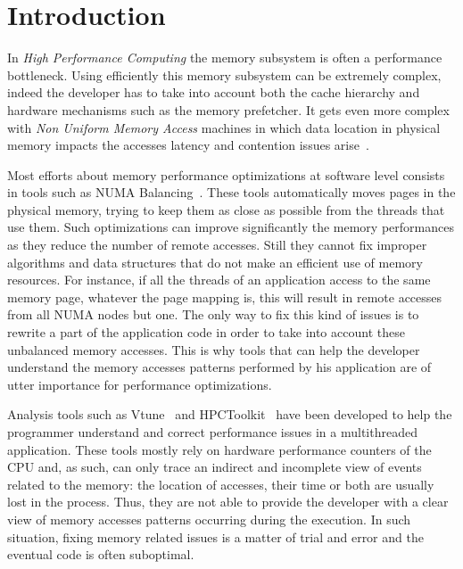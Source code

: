 \section{Introduction}
\label{sec:intro}

In \emph{High Performance Computing} the memory subsystem is often a performance bottleneck.
Using efficiently this memory subsystem can be extremely
complex, indeed the developer has to take into account both the cache hierarchy and
hardware mechanisms such as the memory prefetcher. It gets even more complex with
\emph{Non Uniform Memory Access} machines in which data location in
physical memory impacts the accesses latency and contention issues arise~\cite{Drepper07What}.

Most efforts about memory performance optimizations at software level consists
in tools such as NUMA Balancing~\cite{Corbet2012}.
These tools automatically moves pages in the physical memory, trying
to keep them as close as possible from the threads that use them. Such
optimizations can improve significantly the memory performances as they reduce
the number of remote accesses. Still they cannot fix improper algorithms and data structures that do not make an efficient use of memory resources.
For instance, if all the
threads of an application access to the same memory page, whatever the page mapping is,
this will result in remote accesses from all NUMA nodes but one. The only way to fix
this kind of issues is to rewrite a part of the application code in order to take into account these
unbalanced memory accesses. This is why tools that can help the developer understand the memory accesses patterns
performed by his application are of utter importance for performance optimizations.

Analysis tools such as Vtune~\cite{Reinders05VTune} and
HPCToolkit~\cite{Adhianto10HPCTOOLKIT} have been developed to help the programmer
understand and correct performance issues in a multithreaded application. These tools
mostly rely on hardware performance counters of the CPU and, as such, can only trace an indirect and incomplete view of events related to the memory:
the location of accesses,
their time or both are usually lost in the process. Thus, they are not able to provide the developer with
a clear view of memory accesses patterns occurring during the execution. In such situation, fixing
memory related issues is a matter of trial and error and the eventual code is often suboptimal.

